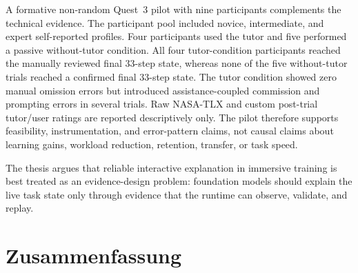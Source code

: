 A formative non-random Quest~3 pilot with nine participants complements the
technical evidence. The participant pool included novice, intermediate, and
expert self-reported profiles. Four participants used the tutor and five
performed a passive without-tutor condition. All four tutor-condition
participants reached the manually reviewed final 33-step state, whereas none
of the five without-tutor trials reached a confirmed final 33-step state. The
tutor condition showed zero manual omission errors but introduced
assistance-coupled commission and prompting errors in several trials. Raw
NASA-TLX and custom post-trial tutor/user ratings are reported descriptively
only. The pilot therefore
supports feasibility, instrumentation, and error-pattern claims, not causal
claims about learning gains, workload reduction, retention, transfer, or task
speed.

The thesis argues that reliable interactive explanation in immersive training
is best treated as an evidence-design problem: foundation models should explain
the live task state only through evidence that the runtime can observe,
validate, and replay.

\newpage
\chapter*{Zusammenfassung}

